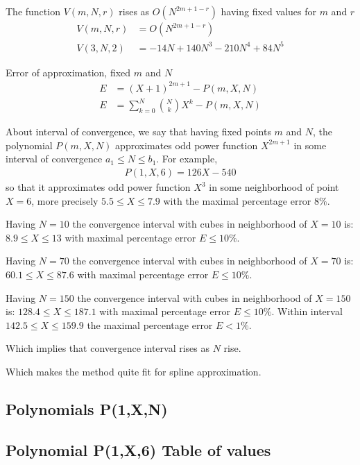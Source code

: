 \documentclass[12pt,letterpaper,oneside,reqno]{amsart}
\newcommand \polynomialP [4][P]{{#1}(#2,#3,#4)}
\begin{document}
    The function $V(m, N, r)$ rises as $O(N^{2m+1-r})$ having fixed values for $m$ and $r$
    \begin{align*}
        V(m, N, r) &= O(N^{2m+1-r}) \\
        V(3, N, 2) &= -14 N + 140 N^3 - 210 N^4 + 84 N^5
    \end{align*}

    Error of approximation, fixed $m$ and $N$
    \begin{align*}
        E &= (X+1)^{2m+1} - \polynomialP{m}{X}{N} \\
        E &= \sum_{k=0}^{N} \binom{N}{k} X^k - \polynomialP{m}{X}{N}
    \end{align*}

    About interval of convergence, we say that having fixed points $m$ and $N$,
    the polynomial $\polynomialP{m}{X}{N}$ approximates odd power function $X^{2m+1}$ in some interval
    of convergence $a_1 \leq N \leq b_1$.
    For example,
    \begin{align*}
        \polynomialP{1}{X}{6} = 126X - 540
    \end{align*}
    so that it approximates odd power function $X^3$ in some neighborhood of point $X=6$, more precisely
    $5.5 \leq X \leq 7.9$ with the maximal percentage error $8\%$.

    Having $N=10$ the convergence interval with cubes in neighborhood of $X=10$ is: $8.9 \leq X \leq 13$
    with maximal percentage error $E \leq 10\%$.

    Having $N=70$ the convergence interval with cubes in neighborhood of $X=70$ is: $60.1 \leq X \leq 87.6$
    with maximal percentage error $E \leq 10\%$.

    Having $N=150$ the convergence interval with cubes in neighborhood of $X=150$ is: $128.4 \leq X \leq 187.1$
    with maximal percentage error $E \leq 10\%$.
    Within interval $142.5 \leq X \leq 159.9$ the maximal percentage error $E < 1\%$.

    Which implies that convergence interval rises as $N$ rise.

    Which makes the method quite fit for spline approximation.

    \clearpage

    \subsection{Polynomials P(1,X,N)}
    

    \subsection{Polynomial P(1,X,6) Table of values}
    
\end{document}
